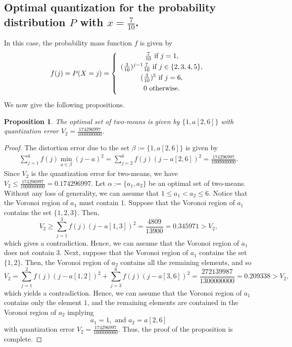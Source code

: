 \documentclass[12pt, reqno]{amsart}
\theoremstyle{plain}
\newtheorem{prop}[subsection]{Proposition}
\theoremstyle{definition}
\newcommand{\set}[1]{\{#1\}}%
\newcommand{\ga}{\alpha}
\newcommand{\gb}{\beta}
\newcommand{\te}{\text}%
\begin{document}
\subsection{Optimal quantization for the probability distribution $P$ with $x=\frac7{10}$.}
In this case, the probability mass function $f$ is given by
\[f(j)=P(X=j)=\left\{\begin{array} {cc}\vspace {0.05 in}
\frac 7{10}  \te{ if } j=1, \\  
\vspace {0.05 in}  
 (\frac 3{10})^{j-1}\frac 7{10} \te{ if } j\in \set{ 2, 3, 4, 5}, \\  \vspace {0.05 in}
(\frac 3{10})^{5} \te { if } j=6,\\  \vspace {0.05 in} 
0 \te{ otherwise.}
\end{array}
\right.
 \]
 We now give the following propositions.
\begin{prop} \label{prop22}
The optimal set of two-means is given by $\set{1, a[2, 6]}$ with quantization error $V_2=\frac{174296997}{1000000000}$.
\end{prop}

\begin{proof} The distortion error due to the set $\gb:=\set{1, a[2, 6]}$ is given by
\begin{align*} \sum_{j=1}^6 f(j)\min_{a\in \gb} (j-a)^2=\sum _{j=2}^6 f(j)(j-a[2, 6])^2=\frac{174296997}{1000000000}.
\end{align*}
Since $V_2$ is the quantization error for two-means, we have $V_2\leq \frac{174296997}{1000000000}=0.174296997$.
Let $\ga:=\set{a_1, a_2}$ be an optimal set of two-means. Without any loss of generality, we can assume that $1\leq a_1<a_2\leq 6$. Notice that the Voronoi region of $a_1$ must contain $1$. Suppose that the Voronoi region of $a_1$ contains the set $\set{1,2,3}$. Then,
\[V_2\geq \sum _{j=1}^3f(j)(j-a[1, 3])^2=\frac{4809}{13900}=0.345971>V_2,\]
which gives a contradiction. Hence, we can assume that the Voronoi region of $a_1$ does not contain $3$. Next, suppose that the Voronoi region of $a_1$ contains the set $\set{1,2}$. Then, the Voronoi region of $a_2$ contains all the remaining elements, and so
\[V_2=\sum _{j=1}^2f(j)(j-a[1,2])^2+\sum _{j=3}^6f(j)(j-a[3, 6])^2=\frac{272139987}{1300000000}=0.209338>V_2,\]
which yields a contradiction.
Hence, we can assume that the Voronoi region of $a_1$ contains only the element $1$, and the remaining elements are contained in the Voronoi region of $a_2$ implying
\[a_1=1, \te{ and } a_2=a[2,6]\]
with quantization error $V_2=\frac{174296997}{1000000000}$. Thus, the proof of the proposition is complete.
\end{proof}
\end{document}
